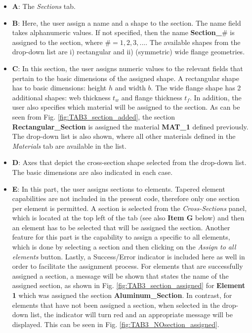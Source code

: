 \begin{appendices}
\begin{itemize}
	\item \textbf{A}: The \textit{Sections} tab.
	\item \textbf{B}: Here, the user assign a name and a shape to the section. 
	The name field takes alphanumeric values. If not specified, then the name 
	\textbf{Section\_}$\#$ is assigned to the section, where $\# = 1,2,3, ...$. 
	The available shapes from the drop-down list are i) rectangular and ii) 
	(symmetric) wide flange geometries. 
	\item \textbf{C}: In this section, the user assigns numeric values to the 
	relevant fields that pertain to the basic dimensions of the assigned shape. 
	A rectangular shape has to basic dimensions: height $h$ and width $b$. The 
	wide flange shape has 2 additional shapes: web thickness $t_w$ and flange 
	thickness $t_f$. In addition, the user also specifies which material will 
	be assigned to the section. As can be seen from Fig. 
	\ref{fig:TAB3_section_added}, the section \textbf{Rectangular\_Section} is 
	assigned the material \textbf{MAT\_1} defined previously. The drop-down 
	list is also shown, where all other materials defined in the 
	\textit{Materials} tab are available in the list.
	\item \textbf{D}: Axes that depict the cross-section shape selected from 
	the drop-down list. The basic dimensions are also indicated in each case.
	\item \textbf{E}: In this part, the user assigns sections to elements. 
	Tapered element capabilities are not included in the present code, 
	therefore 
	only one section per element is permitted. A section is selected from the 
	\textit{Cross-Sections} panel, which is located at the top left of the tab 
	(see also \textbf{Item G} below) and then an element has to be selected 
	that will be assigned the section. Another feature for this part is the 
	capability to assign a specific to all elements, which is done by selecting 
	a section and then clicking on the \textit{Assign to all elements} button. 
	Lastly, a Success/Error indicator is included here as well in order to 
	facilitate the assignment process. For elements that are successfully 
	assigned a section, a message will be shown that states the name of the 
	assigned section, as shown in Fig. \ref{fig:TAB3_section_assigned} for 
	\textbf{Element 1} which was assigned the section 
	\textbf{Aluminum\_Section}. In contrast, for elements that have not been 
	assigned a section, when selected in the drop-down list, the indicator will 
	turn red and an appropriate message will be displayed. This can be seen in 
	Fig. \ref{fig:TAB3_NOsection_assigned}.
\end{itemize}


\end{appendices}
